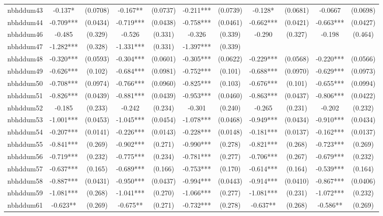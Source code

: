\documentclass[]{article}
\begin{document}
\begin{tabular}{lcccccccccc}
nbhddum43 & -0.137* & (0.0708) & -0.167** & (0.0737) & -0.211*** & (0.0739) & -0.128* & (0.0681) & -0.0667 & (0.0698) \\
nbhddum44 & -0.709*** & (0.0434) & -0.719*** & (0.0438) & -0.758*** & (0.0461) & -0.662*** & (0.0421) & -0.663*** & (0.0427) \\
nbhddum46 & -0.485 & (0.329) & -0.526 & (0.331) & -0.326 & (0.339) & -0.290 & (0.327) & -0.198 & (0.464) \\
nbhddum47 & -1.282*** & (0.328) & -1.331*** & (0.331) & -1.397*** & (0.339) &  &  &  &  \\
nbhddum48 & -0.320*** & (0.0593) & -0.304*** & (0.0601) & -0.305*** & (0.0622) & -0.229*** & (0.0568) & -0.220*** & (0.0566) \\
nbhddum49 & -0.626*** & (0.102) & -0.684*** & (0.0981) & -0.752*** & (0.101) & -0.688*** & (0.0970) & -0.629*** & (0.0973) \\
nbhddum50 & -0.708*** & (0.0974) & -0.766*** & (0.0960) & -0.825*** & (0.103) & -0.676*** & (0.101) & -0.655*** & (0.0994) \\
nbhddum51 & -0.826*** & (0.0439) & -0.881*** & (0.0439) & -0.953*** & (0.0460) & -0.863*** & (0.0437) & -0.806*** & (0.0422) \\
nbhddum52 & -0.185 & (0.233) & -0.242 & (0.234) & -0.301 & (0.240) & -0.265 & (0.231) & -0.202 & (0.232) \\
nbhddum53 & -1.001*** & (0.0453) & -1.045*** & (0.0454) & -1.078*** & (0.0468) & -0.949*** & (0.0434) & -0.910*** & (0.0434) \\
nbhddum54 & -0.207*** & (0.0141) & -0.226*** & (0.0143) & -0.228*** & (0.0148) & -0.181*** & (0.0137) & -0.162*** & (0.0137) \\
nbhddum55 & -0.841*** & (0.269) & -0.902*** & (0.271) & -0.990*** & (0.278) & -0.821*** & (0.268) & -0.723*** & (0.269) \\
nbhddum56 & -0.719*** & (0.232) & -0.775*** & (0.234) & -0.781*** & (0.277) & -0.706*** & (0.267) & -0.679*** & (0.232) \\
nbhddum57 & -0.637*** & (0.165) & -0.689*** & (0.166) & -0.753*** & (0.170) & -0.614*** & (0.164) & -0.539*** & (0.164) \\
nbhddum58 & -0.887*** & (0.0431) & -0.950*** & (0.0437) & -0.994*** & (0.0443) & -0.914*** & (0.0410) & -0.867*** & (0.0406) \\
nbhddum59 & -1.081*** & (0.268) & -1.041*** & (0.270) & -1.066*** & (0.277) & -1.081*** & (0.231) & -1.072*** & (0.232) \\
nbhddum61 & -0.623** & (0.269) & -0.675** & (0.271) & -0.732*** & (0.278) & -0.637** & (0.268) & -0.586** & (0.269) \\

\end{tabular}
\end{document}
